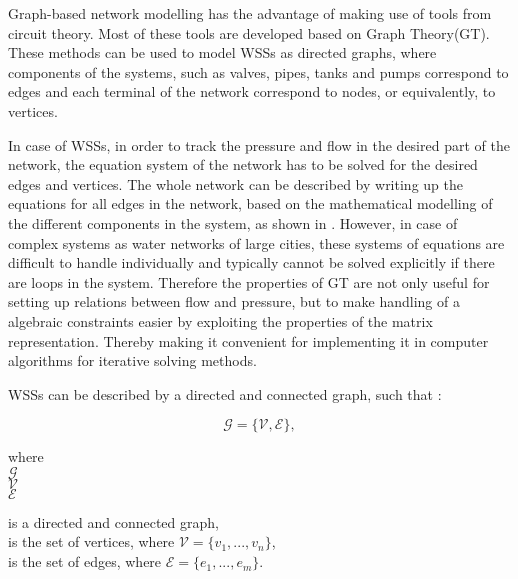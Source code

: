 Graph-based network modelling has the advantage of making use of tools from circuit theory. Most of these tools are developed based on Graph Theory(GT). These methods can be used to model WSSs as directed graphs, where components of the systems, such as valves, pipes, tanks and pumps correspond to edges and each terminal of the network correspond to nodes, or equivalently, to vertices.

In case of WSSs, in order to track the pressure and flow in the desired part of the network, the equation system of the network has to be solved for the desired edges and vertices. The whole network can be described by writing up the equations for all edges in the network, based on the mathematical modelling of the different components in the system, as shown in . However, in case of complex systems as water networks of large cities, these systems of equations are difficult to handle individually and typically cannot be solved explicitly if there are loops in the system. Therefore the properties of GT are not only useful for setting up relations between flow and pressure, but to make handling of a algebraic constraints easier by exploiting the properties of the matrix representation. Thereby making it convenient for implementing it in computer algorithms for iterative solving methods.  

WSSs can be described by a directed and connected graph, such that \cite{graph_intro}: 

\begin{equation}
  \label{Numberofchords}
  \mathcal{G} = \{\mathcal{V}, \mathcal{E} \} ,
\end{equation}

\begin{minipage}[t]{0.2\textwidth}
where\\
\hspace*{8mm} $\mathcal{G} $ \\
\hspace*{8mm} $\mathcal{V} $ \\
\hspace*{8mm} $\mathcal{E} $
\end{minipage}
\begin{minipage}[t]{0.68\textwidth}
\vspace*{2mm}
is a directed and connected graph,\\
is the set of vertices, where $\mathcal{V} = \{v_1, ..., v_n\}$,\\
is the set of edges, where $\mathcal{E} = \{e_1, ..., e_m\}$. 
\end{minipage}

